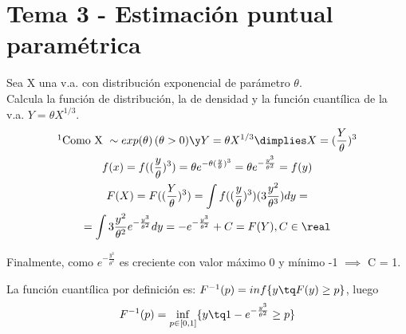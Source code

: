 \newpage
\section{Tema 3 - Estimación puntual paramétrica}

\begin{problem}[1]
Sea X una v.a. con distribución exponencial de parámetro $\theta$.\\
Calcula la función de distribución, la de densidad y la función cuantílica de la v.a. $ Y = \theta X^{1/3} $.
\solution
\begin{gather*}
\footnotemark\text{Como X }\sim exp(\theta) \,(\theta > 0) \y Y = \theta X^{1/3} \dimplies X = (\frac{Y}{\theta})^{3}\\
f(x) = f((\frac{y}{\theta})^3) =
\theta e^{-\theta (\frac{y}{\theta})^3} =
\theta e^{-\frac{y^3}{\theta^2}} =
f(y) \\
F(X) = F((\frac{Y}{\theta})^{3}) =
\int f((\frac{y}{\theta})^{3}) (3\frac{y^2}{\theta^3}) dy =\\
= \int 3\frac{y^2}{\theta^2} e^{-\frac{y^3}{\theta^2}} dy =
- e^{-\frac{y^3}{\theta^2}} + C = F(Y),  C \in \real
\end{gather*}

Finalmente, como $ e^{-\frac{y^3}{\theta^2}} $ es creciente con valor máximo 0 y mínimo -1 $ \implies $ C = 1.

La función cuantílica por definición es: $ F^{-1}(p) = inf\{y \tq F(y) \geq p\} $, luego
\[
F^{-1}(p) = \inf_{p \in [0,1]}\{ y \tq 1 - e^{-\frac{y^3}{\theta^2}} \geq p \}
\]

\end{problem}

